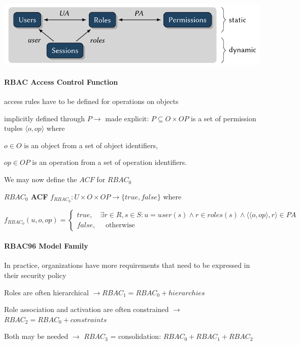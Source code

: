 \documentclass[a4paper]{article}
\renewcommand{\note}[2]{\begin{noteBox} \textbf{#1} #2 \end{noteBox}}
\begin{document}
\begin{multicols}{3}
    \includegraphics[width=.5\linewidth]{Assets/Systemsicherheit-rbac-0.png}

    \paragraph{RBAC Access Control Function}
    \begin{itemize*}
        \item access rules have to be defined for operations on objects
        \item implicitly defined through $P\rightarrow$ made explicit: $P\subseteq O\times OP$ is a set of permission tuples $\langle o,op\rangle$ where
        \begin{itemize*}
            \item $o\in O$ is an object from a set of object identifiers,
            \item $op\in OP$ is an operation from a set of operation identifiers.
        \end{itemize*}
        \item We may now define the $ACF$ for $RBAC_0$
    \end{itemize*}

    \note{$RBAC_0$ ACF}{
        $f_{RBAC_0}:U \times O\times OP\rightarrow\{true,false\}$ where

        $f_{RBAC_0} (u,o,op)= \begin{cases} true, \quad \exists r\in R,s\in S:u=user(s)\wedge r\in roles(s)\wedge \langle \langle o,op\rangle ,r\rangle  \in PA \\ false, \quad\text{ otherwise } \end{cases}$
    }

    \paragraph{RBAC96 Model Family}
    In practice, organizations have more requirements that need to be expressed in their security policy
    \begin{itemize*}
        \item Roles are often hierarchical $\rightarrow RBAC_1 = RBAC_0 + hierarchies$
        \item Role association and activation are often constrained $\rightarrow$ $RBAC_2 = RBAC_0 + constraints$
        \item Both may be needed $\rightarrow$ $RBAC_3$ = consolidation: $RBAC_0 + RBAC_1 + RBAC_2$
    \end{itemize*}


\end{multicols}
\end{document}
